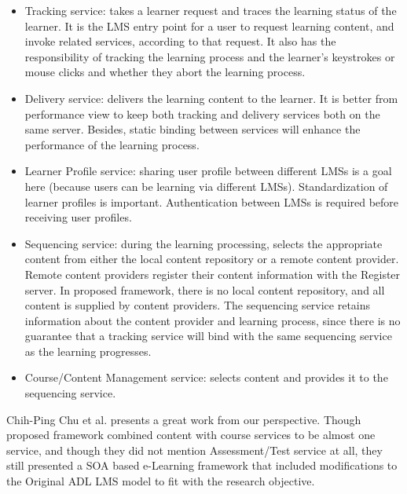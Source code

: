 \documentclass[12pt,a4paper,final,twoside,onecolumn,titlepage]{book}
\begin{document}
\begin{itemize}
\item Tracking service: takes a learner request and traces the learning status of the learner. It is the \gls{LMS} entry point for a user to request learning content, and invoke related services, according to that request. It also has the responsibility of tracking the learning process and the learner’s keystrokes or mouse clicks and whether they abort the learning process. 
\item Delivery service: delivers the learning content to the learner. It is better from performance view to keep both tracking and delivery services both on the same server. Besides, static binding between services will enhance the performance of the learning process.
\item Learner Profile service: sharing user profile between different \gls{LMS}s is a goal here (because users can be learning via different \gls{LMS}s). Standardization of learner profiles is important. Authentication between \gls{LMS}s is required before receiving user profiles. 
\item Sequencing service: during the learning processing, selects the appropriate content from either the local content repository or a remote content provider. Remote content providers register their content information with the Register server. In proposed framework, there is no local content repository, and all content is supplied by content providers. The sequencing service retains information about the content provider and learning process, since there is no guarantee that a tracking service will bind with the same sequencing service as the learning progresses. 
\item Course/Content Management service: selects content and provides it to the sequencing service. 
\end{itemize}

Chih-Ping Chu et al. presents a great work from our perspective. Though proposed framework combined content with course services to be almost one service, and though they did not mention Assessment/Test service at all, they still presented a \gls{SOA} based e-Learning framework that included modifications to the Original \gls{ADL} \gls{LMS} model to fit with the research objective.
\end{document}
